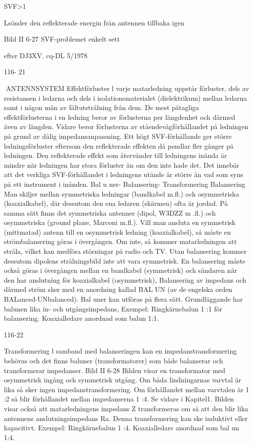 {{{{SVF>1

Lsönder den reflekterade energin
från antennen tillbaka igen

Bild II 6-27 SVF-problemet enkelt sett

efter DJ3XV. cq-DL 5/1978

116- 21

ANTENNSYSTEM
Effektförluster
l varje matarledning uppstår förluster, dels
av resistansen i ledarna och dels i isolationsmaterialet (dielektrikum) mellan ledarna samt i någon mån av fältutstrålning från
dem. De mest påtagliga effektförlusterna i
en ledning beror av förlusterna per längdenhet och därmed även av längden. Vidare
beror förlusterna av ståendevågförhållandet på ledningen på grund av dålig impedansanpassning.
Ett högt SVF-förhållande ger större ledningsförluster eftersom den reflekterade effekten då pendlar fler gånger på ledningen.
Den reflekterade effekt som återvänder till
ledningens inända är mindre när ledningen
har stora förluster än om den inte hade det.
Det innebär att det verkliga SVF-förhållandet i ledningens utände är större än vad som
syns på ett instrument i inänden.
Bal u ner- Balansering- Transformering
Balansering
Man skiljer mellan symmetriska ledningar
(bandkabel m.fl.) och osymmetriska (koaxialkabel), där dessutom den ena ledaren (skärmen) ofta är jordad.
På samma sätt finns det symmetriska
antenner (dipol, W3DZZ m .fl.) och osymmetriska (ground plane, Marconi m.fl.).
Vill man ansluta en symmetrisk (mittmatad) antenn till en osymmetrisk ledning
(koaxialkabel), så måste en strömbalansering göras i övergången. Om inte, så kommer matarledningen att stråla, vilket kan
medföra störningar på radio och TV. Utan
balansering kommer dessutom dipolens
strålningsbild inte att vara symmetrisk.
En balansering måste också göras i övergången mellan en bandkabel (symmetrisk)
och sändaren när den har anslutning för
koaxialkabel (osymmetrisk),
Balansering av impedans och därmed
ström sker med en anordning kallad BAL UN
(av de engelska orden BALanced-UNbalanced).
Bal uner kan utföras på flera sätt. Grundläggande har balunen lika in- och utgångsimpedans,
Exempel:
Ringkärnebalun 1 :1 för balansering.
Koaxialledare anordnad som balun 1:1.

116-22

Transformering
l samband med balanseringen kan en
impedanstransformering behövas och det
finns baluner (transformatorer) som både
balanserar och transformerar impedanser.
Bild II 6-28
Bilden visar en transformator med osymmetrisk ingång och symmetrisk utgång. Om
båda lindningarnas varvtal är lika så sker
ingen impedanstransformering. Om förhållandet mellan varvtalen är 1 :2 så blir förhållandet mellan impedanserna 1 :4. Se vidare
i Kapitel1.
Bilden visar också att matarledningens
impedans Z transformeras om så att den blir
lika antennens anslutningsimpedans Ra.
Denna transformering kan ske induktivt eller kapacitivt.
Exempel:
Ringkärnebalun 1 :4.
Koaxialledare anordnad som bal un 1:4.

}}}}
